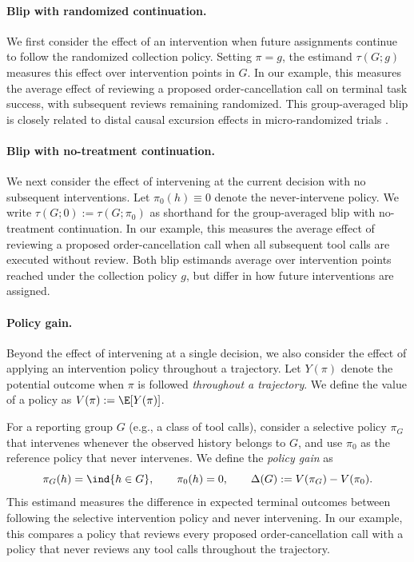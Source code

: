 \paragraph{Blip with randomized continuation.}
We first consider the effect of an intervention when future assignments continue to follow the randomized collection policy.
Setting $\pi=g$, the estimand $\tau(G;g)$ measures this effect over intervention points in $G$. In our example, this measures the average effect of reviewing a proposed order-cancellation call on terminal task success, with subsequent reviews remaining randomized.
This group-averaged blip is closely related to distal causal excursion effects in micro-randomized trials \citep{boruvka2018moderation,qian2025distal}.

\paragraph{Blip with no-treatment continuation.}
We next consider the effect of intervening at the current decision with no subsequent interventions.
Let $\pi_0(h)\equiv 0$ denote the never-intervene policy.
We write $\tau(G;0):=\tau(G;\pi_0)$ as shorthand for the group-averaged blip with no-treatment continuation.
In our example, this measures the average effect of reviewing a proposed order-cancellation call when all subsequent tool calls are executed without review.
Both blip estimands average over intervention points reached under the collection policy $g$, but differ in how future interventions are assigned.

\paragraph{Policy gain.}
Beyond the effect of intervening at a single decision, we also consider the effect of applying an intervention policy throughout a trajectory.
Let $Y(\pi)$ denote the potential outcome when $\pi$ is followed {\em throughout a trajectory}.
We define the value of a policy as $V(\pi):=\E[Y(\pi)]$.

For a reporting group $G$ (e.g., a class of tool calls), consider a selective policy $\pi_G$ that intervenes whenever the observed history belongs to $G$, and use $\pi_0$ as the reference policy that never intervenes.
We define the {\em policy gain} as
\begin{equation}
    \pi_G(h)=\ind\{h\in G\},
    \qquad
    \pi_0(h)=0,
    \qquad
    \Delta(G):=V(\pi_G)-V(\pi_0).
    \label{eq:policy-target}
\end{equation}
This estimand measures the difference in expected terminal outcomes between following the selective intervention policy and never intervening.
In our example, this compares a policy that reviews every proposed order-cancellation call with a policy that never reviews any tool calls throughout the trajectory.

